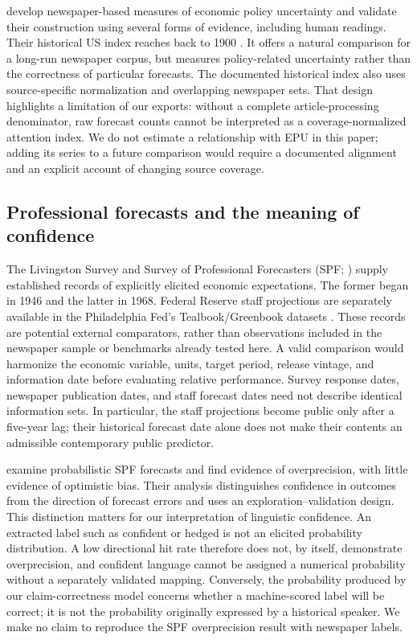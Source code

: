 \citet{baker2016} develop newspaper-based measures of economic policy uncertainty and validate their construction using several forms of evidence, including human readings. Their historical US index reaches back to 1900 \citep{bakerhistorical}. It offers a natural comparison for a long-run newspaper corpus, but measures policy-related uncertainty rather than the correctness of particular forecasts. The documented historical index also uses source-specific normalization and overlapping newspaper sets. That design highlights a limitation of our exports: without a complete article-processing denominator, raw forecast counts cannot be interpreted as a coverage-normalized attention index. We do not estimate a relationship with EPU in this paper; adding its series to a future comparison would require a documented alignment and an explicit account of changing source coverage.

\subsection{Professional forecasts and the meaning of confidence}
The Livingston Survey \citep{philalivingston} and Survey of Professional Forecasters (SPF; \citealp{philaspf}) supply established records of explicitly elicited economic expectations. The former began in 1946 and the latter in 1968. Federal Reserve staff projections are separately available in the Philadelphia Fed's Tealbook/Greenbook datasets \citep{philagreenbook}. These records are potential external comparators, rather than observations included in the newspaper sample or benchmarks already tested here. A valid comparison would harmonize the economic variable, units, target period, release vintage, and information date before evaluating relative performance. Survey response dates, newspaper publication dates, and staff forecast dates need not describe identical information sets. In particular, the staff projections become public only after a five-year lag; their historical forecast date alone does not make their contents an admissible contemporary public predictor.

\citet{campbell2024} examine probabilistic SPF forecasts and find evidence of overprecision, with little evidence of optimistic bias. Their analysis distinguishes confidence in outcomes from the direction of forecast errors and uses an exploration--validation design. This distinction matters for our interpretation of linguistic confidence. An extracted label such as confident or hedged is not an elicited probability distribution. A low directional hit rate therefore does not, by itself, demonstrate overprecision, and confident language cannot be assigned a numerical probability without a separately validated mapping. Conversely, the probability produced by our claim-correctness model concerns whether a machine-scored label will be correct; it is not the probability originally expressed by a historical speaker. We make no claim to reproduce the SPF overprecision result with newspaper labels.

